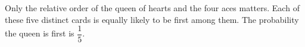 Only the relative order of the queen of hearts and the four aces matters. Each of these five distinct cards is equally likely to be first among them. The probability the queen is first is $\boxed{\dfrac{1}{5}}$.
